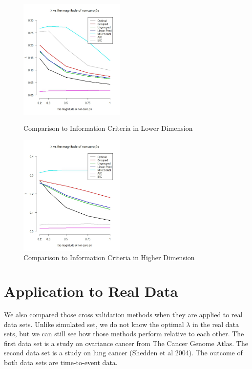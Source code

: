 \documentclass{article}\usepackage[]{graphicx}\usepackage[]{color}
\begin{document}
   \begin{figure}[h]
    \centering
    \begin{minipage}[b]{0.4\textwidth}
      \centering
		  \includegraphics[height= 6cm ]{./figures/aic_01.jpeg}
      \caption{Comparison to Information Criteria in Lower Dimension}
     \end{minipage}
     \begin{minipage}[b]{0.4\textwidth}
      \centering
		  \includegraphics[height= 6cm ]{./figures/aic_02.jpeg}
      \caption{Comparison to Information Criteria in Higher Dimension}
      \end{minipage}	
   \end{figure}	
    
  
\section{Application to Real Data}

We also compared those cross validation methods when they are applied to real data sets. Unlike simulated set, we do not know the optimal $\lambda$ in the real data sets, but we can still see how those methods perform relative to each other. The first data set is a study on ovariance cancer from The Cancer Genome Atlas. The second data set is a study on lung cancer (Shedden et al 2004). The outcome of both data sets are time-to-event data.
\end{document}
